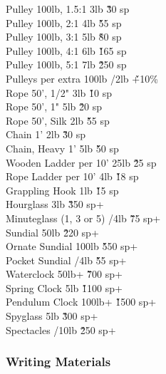 \begin{multicols}{3}
{\begin{tabbing}
Pulley 100lb, 1.5:1			\> 3lb			\' \` 30 sp \\
Pulley 100lb, 2:1			\> 4lb			\' \` 55 sp \\
Pulley 100lb, 3:1			\> 5lb			\' \` 80 sp \\
Pulley 100lb, 4:1			\> 6lb			\' \` 165 sp \\
Pulley 100lb, 5:1			\> 7lb			\' \` 250 sp \\
Pulleys per extra 100lb			/2lb		\' \` +10\% \\
Rope 50', 1/2"				\> 3lb			\' \` 10 sp \\
Rope 50', 1"				\> 5lb			\' \` 20 sp \\
Rope 50', Silk				\> 2lb			\' \` 55 sp \\
Chain 1'				\> 2lb			\' \` 30 sp \\
Chain, Heavy 1'				\> 5lb			\' \` 50 sp \\
Wooden Ladder per 10'			\> 25lb			\' \` 25 sp \\
Rope Ladder per 10'			\> 4lb			\' \` 18 sp \\
Grappling Hook				\> 1lb			\' \` 15 sp \\
Hourglass				\> 3lb			\' \` 350 sp+ \\
Minuteglass (1, 3 or 5)			/4lb		\' \` 75 sp+ \\
Sundial					\> 50lb			\' \` 220 sp+ \\
Ornate Sundial				\> 100lb		\' \` 550 sp+ \\
Pocket Sundial				/4lb		\' \` 55 sp+ \\
Waterclock				\> 50lb+		\' \` 700 sp+ \\
Spring Clock				\> 5lb			\' \` 1100 sp+ \\
Pendulum Clock				\> 100lb+		\' \` 1500 sp+ \\
Spyglass				\> 5lb			\' \` 300 sp+ \\
Spectacles				/10lb		\' \`250 sp+ \\
\end{tabbing}

\subsubsection{Writing Materials}

}
\end{multicols}
